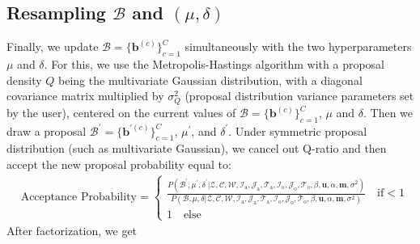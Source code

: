 \documentclass[a4paper]{article}
\begin{document}
 \subsection{Resampling $\mathcal{B}$ and  $(\mu, \delta)$}  \label{subsec: Resampling B}
 Finally, we update $\mathcal{B}=\{\boldsymbol{b}^{(c)}\}_{c=1}^C$ simultaneously with the two hyperparameters $\mu$ and $\delta$. For this, we use the Metropolis-Hastings algorithm with a proposal density $Q$ being the multivariate Gaussian distribution, with a diagonal covariance matrix multiplied by $\sigma^2_Q$ (proposal distribution variance parameters set by the user), centered on the current values of $\mathcal{B}=\{\boldsymbol{b}^{(c)}\}_{c=1}^C$, $\mu$ and $\delta$. Then we draw a proposal $\mathcal{B}^\prime=\{\boldsymbol{b}^{\prime(c)}\}_{c=1}^C$, $\mu^\prime$, and $\delta^\prime$. Under symmetric proposal distribution (such as multivariate Gaussian), we cancel out Q-ratio and then accept the new proposal probability equal to:
 \begin{equation}
 \begin{split}
 & \mbox{Acceptance Probability}=
 \begin{cases}  \frac{P(\mathcal{B}^\prime, \mu^\prime, \delta^\prime|\mathcal{Z},   \mathcal{C},  \mathcal{W}, \mathcal{I}_{\mbox{a}}, \mathcal{J}_{\mbox{a}}, \mathcal{T}_{\mbox{a}}, \mathcal{I}_{\mbox{o}}, \mathcal{J}_{\mbox{o}}, \mathcal{T}_{\mbox{o}}, \beta, \boldsymbol{u}, \alpha, \boldsymbol{m}, \sigma^2)}{P(\mathcal{B}, \mu, \delta|\mathcal{Z},   \mathcal{C},  \mathcal{W}, \mathcal{I}_{\mbox{a}}, \mathcal{J}_{\mbox{a}}, \mathcal{T}_{\mbox{a}}, \mathcal{I}_{\mbox{o}}, \mathcal{J}_{\mbox{o}}, \mathcal{T}_{\mbox{o}}, \beta, \boldsymbol{u}, \alpha, \boldsymbol{m}, \sigma^2)}\quad\text{if}  <1\\
 1 \quad \text{else}
 \end{cases}
 \end{split}
 \end{equation}
 After factorization, we get
\end{document}
